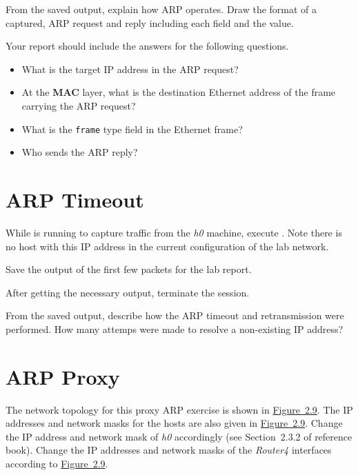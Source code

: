 \documentclass{../UTNetLab}
\begin{document}
\begin{report}
    \item From the saved  output, explain how ARP operates.
    Draw the format of a captured, ARP request and reply including each field and the value.
\end{report}

Your report should include the answers for the following questions.
\begin{itemize}
    \item What is the target IP address in the ARP request?
    \item At the \textbf{MAC} layer, what is the destination Ethernet address of the frame carrying the ARP request?
    \item What is the \texttt{frame} type field in the Ethernet frame?
    \item Who sends the ARP reply?
\end{itemize}

\section{ARP Timeout}
While  is running to capture traffic from the \textit{h0} machine, execute .
Note there is no host with this IP address in the current configuration of the lab network.

Save the  output of the first few packets for the lab report.

After getting the necessary output, terminate the  session.

\begin{report}
    \item From the saved  output, describe how the ARP timeout and retransmission were performed.
    How many attemps were made to resolve a non-existing IP address?
\end{report}

\section{ARP Proxy}
The network topology for this proxy ARP exercise is shown in \hyperref[fig:2.9]{Figure~2.9}.
The IP addresses and network masks for the hosts are also given in \hyperref[fig:2.9]{Figure~2.9}.
Change the IP address and network mask of \textit{h0} accordingly (see Section~2.3.2 of reference book).
Change the IP addresses and network masks of the \textit{Router4} interfaces according to \hyperref[fig:2.9]{Figure~2.9}.
\end{document}
